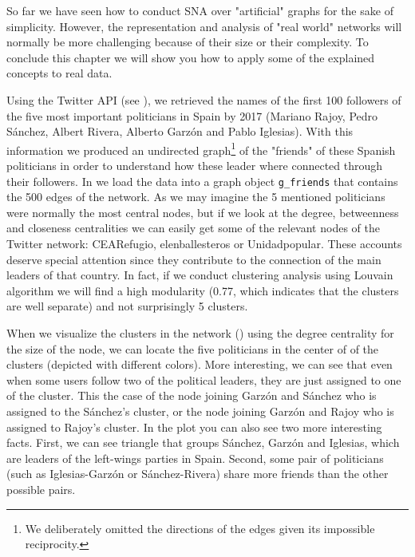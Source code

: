 So far we have seen how to conduct SNA over "artificial" graphs for the sake of simplicity. However, the representation and analysis of "real world" networks will normally be more challenging because of their size or their complexity. To conclude this chapter we will show you how to apply some of the explained concepts to real data.

Using the Twitter API (see ), we retrieved the names of the first 100 followers of the five most important politicians in Spain by 2017 (Mariano Rajoy, Pedro Sánchez, Albert Rivera, Alberto Garzón and Pablo Iglesias). With this information we produced an undirected graph\footnote{We deliberately omitted the directions of the edges given its impossible reciprocity.} of the "friends" of these Spanish politicians in order to understand how these leader where connected through their followers. In  we load the data into a graph object \texttt{g_friends} that contains the 500 edges of the network. As we may imagine the 5 mentioned politicians were normally the most central nodes, but if we look at the degree, betweenness and closeness centralities we can easily get some of the relevant nodes of the Twitter network: CEARefugio, elenballesteros or Unidadpopular. These accounts deserve special attention since they contribute to the connection of the main leaders of that country. In fact, if we conduct clustering analysis using Louvain algorithm we will find a high modularity (0.77, which indicates that the clusters are well separate) and not surprisingly 5 clusters. 


When we visualize the clusters in the network () using the degree centrality for the size of the node, we can locate the five politicians in the center of of the clusters (depicted with different colors). More interesting, we can see that even when some users follow two of the political leaders, they are just assigned to one of the cluster. This the case of the node joining Garzón and Sánchez who is assigned to the Sánchez's cluster, or the node joining Garzón and Rajoy who is assigned to Rajoy's cluster. In the plot you can also see two more interesting facts. First, we can see triangle that groups Sánchez, Garzón and Iglesias, which are leaders of the left-wings parties in Spain. Second, some pair of politicians (such as Iglesias-Garzón or Sánchez-Rivera) share more friends than the other possible pairs. 




